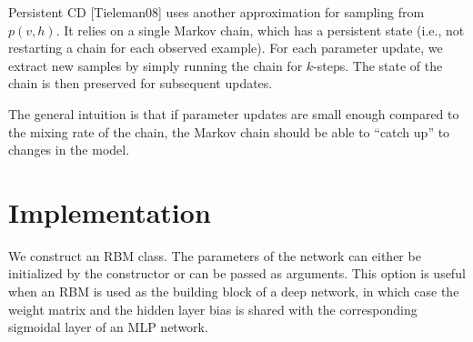 \documentclass[12pt]{article}
\begin{document}
Persistent CD [Tieleman08] uses another approximation for sampling from $p(v,h)$. It relies on a single Markov chain, which has a persistent state (i.e., not restarting a chain for each observed example). For each parameter update, we extract new samples by simply running the chain for $k$-steps. The state of the chain is then preserved for subsequent updates.

The general intuition is that if parameter updates are small enough compared to the mixing rate of the chain, the Markov chain should be able to “catch up” to changes in the model.

\section{Implementation}

We construct an RBM class. The parameters of the network can either be initialized by the constructor or can be passed as arguments. This option is useful when an RBM is used as the building block of a deep network, in which case the weight matrix and the hidden layer bias is shared with the corresponding sigmoidal layer of an MLP network.
\end{document}
